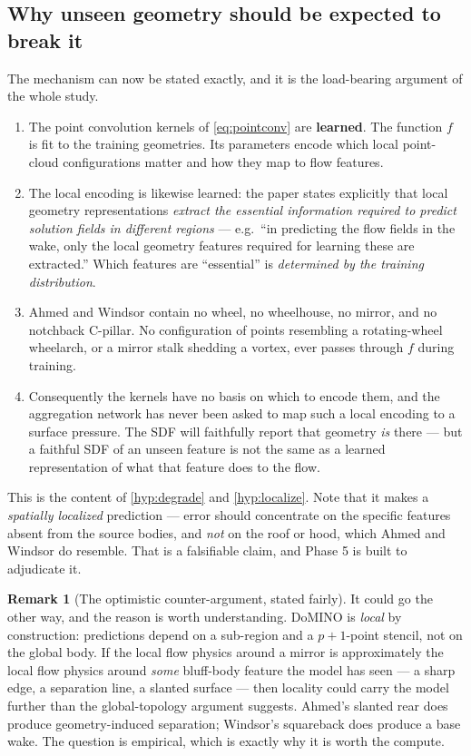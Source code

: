 \documentclass[10pt,a4paper]{article}
\theoremstyle{definition}
\newtheorem{remark}{Remark}[section]
\begin{document}
\subsection{Why unseen geometry should be expected to break it}
\label{sec:whybreak}

The mechanism can now be stated exactly, and it is the load-bearing argument of the
whole study.

\begin{enumerate}[label=(\arabic*)]
  \item The point convolution kernels of \cref{eq:pointconv} are \textbf{learned}.
  The function $f$ is fit to the training geometries. Its parameters encode which
  local point-cloud configurations matter and how they map to flow features.
  \item The local encoding is likewise learned: the paper states explicitly that
  local geometry representations \emph{extract the essential information required to
  predict solution fields in different regions} --- e.g.\ ``in predicting the flow
  fields in the wake, only the local geometry features required for learning these are
  extracted.'' Which features are ``essential'' is \emph{determined by the training
  distribution}.
  \item Ahmed and Windsor contain no wheel, no wheelhouse, no mirror, and no
  notchback C-pillar. No configuration of points resembling a rotating-wheel
  wheelarch, or a mirror stalk shedding a vortex, ever passes through $f$ during
  training.
  \item Consequently the kernels have no basis on which to encode them, and the
  aggregation network has never been asked to map such a local encoding to a
  surface pressure. The SDF will faithfully report that geometry \emph{is} there ---
  but a faithful SDF of an unseen feature is not the same as a learned representation
  of what that feature does to the flow.
\end{enumerate}

This is the content of \cref{hyp:degrade} and \cref{hyp:localize}. Note that it makes
a \emph{spatially localized} prediction --- error should concentrate on the specific
features absent from the source bodies, and \emph{not} on the roof or hood, which
Ahmed and Windsor do resemble. That is a falsifiable claim, and Phase 5 is built to
adjudicate it.

\begin{remark}[The optimistic counter-argument, stated fairly]
It could go the other way, and the reason is worth understanding. DoMINO is
\emph{local} by construction: predictions depend on a sub-region and a $p+1$-point
stencil, not on the global body. If the local flow physics around a mirror is
approximately the local flow physics around \emph{some} bluff-body feature the model
has seen --- a sharp edge, a separation line, a slanted surface --- then locality could
carry the model further than the global-topology argument suggests. Ahmed's slanted
rear does produce geometry-induced separation; Windsor's squareback does produce a
base wake. The question is empirical, which is exactly why it is worth the compute.
\end{remark}
\end{document}
